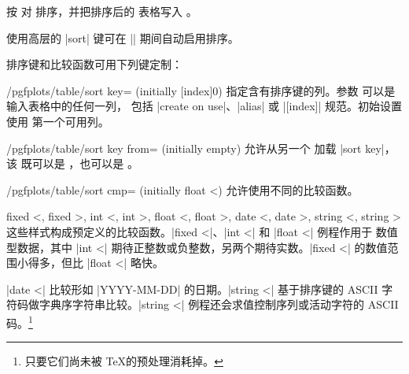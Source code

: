 \documentclass[a4paper,doc2]{ltxdoc}
\begin{document}
\begin{command}{\pgfplotstablesort{}}
    按  对  排序，并把排序后的
    表格写入 。

    使用高层的 |sort| 键可在 |\pgfplotstabletypeset| 期间自动启用排序。
\begin{codeexample}[]
\pgfplotstablesort{}
\pgfplotstabletypeset[columns/c/.style={string type}]{\result}%
\end{codeexample}

    排序键和比较函数可用下列键定制：

    \begin{key}{/pgfplots/table/sort key= (initially [index]0)}
        指定含有排序键的列。参数  可以是输入表格中的任何一列，
        包括 |create on use|、|alias| 或 |[index]| 规范。初始设置使用
        第一个可用列。
    \end{key}

    \begin{key}{/pgfplots/table/sort key from= (initially empty)}
        允许从另一个  加载 |sort key|，该  既可以是
        ，也可以是 。
    \end{key}

    \begin{key}{/pgfplots/table/sort cmp= (initially float <)}
        允许使用不同的比较函数。

        \begin{pgfplotskeylist}{%
            fixed <,
            fixed >,
            int <,
            int >,
            float <,
            float >,
            date <,
            date >,
            string <,
            string >%
        }
            这些样式构成预定义的比较函数。|fixed <|、|int <| 和 |float <| 例程作用于
            数值型数据，其中 |int <| 期待正整数或负整数，另两个期待实数。|fixed <|
            的数值范围小得多，但比 |float <| 略快。

            |date <| 比较形如 |YYYY-MM-DD| 的日期。|string <| 基于排序键的 ASCII
            字符码做字典序字符串比较。|string <| 例程还会求值控制序列或活动字符的
            ASCII 码。\footnote{只要它们尚未被 \TeX 的预处理消耗掉。}
\begin{codeexample}[]
\pgfplotstablesort[sort cmp=string <]
%
\end{codeexample}
        \end{pgfplotskeylist}


\end{key}
\end{command}
\end{document}
